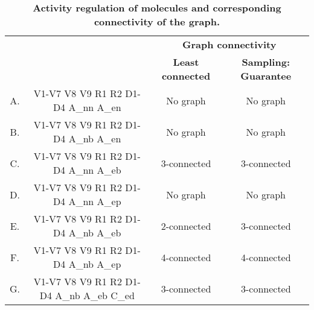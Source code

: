 \begin{table}[!ht]
\centering
\def\arraystretch{1.6}
\caption{
{\bf Activity regulation of molecules and corresponding connectivity of the graph.}}
  \begin{tabular}{|c|c|c|c|}
    \hline
  {\multirow{2}{*}{\textbf{Version}}}  & {\multirow{2}{*}{\textbf{Constraints}}} &  \multicolumn{2}{c|}{\textbf{Graph connectivity}}  \\
   \cline{3-4}
   {} & {} & \textbf{\textbf{Least connected}} & \textbf{Sampling: Guarantee}\\
    \hline
    

A. & V1-V7 V8 V9 R1 R2 D1-D4 A\_nn A\_en & No graph & No graph \\ \hline
B. & V1-V7 V8 V9 R1 R2 D1-D4 A\_nb A\_en & No graph & No graph \\ \hline
C. & V1-V7 V8 V9 R1 R2 D1-D4 A\_nn A\_eb & 3-connected & 3-connected \\  \hline
D. & V1-V7 V8 V9 R1 R2 D1-D4 A\_nn A\_ep & No graph & No graph \\ \hline
E. & V1-V7 V8 V9 R1 R2 D1-D4 A\_nb A\_eb & 2-connected & 3-connected \\ \hline
F. & V1-V7 V8 V9 R1 R2 D1-D4 A\_nb A\_ep & 4-connected & 4-connected \\ \hline
G. & V1-V7 V8 V9 R1 R2 D1-D4 A\_nb A\_eb C\_ed & 3-connected & 3-connected \\ \hline

  \end{tabular}
\label{table1}
\end{table}




